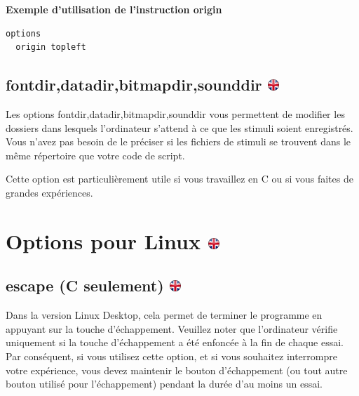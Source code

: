 \documentclass[
]{book}
\begin{document}
\textbf{Exemple d'utilisation de l'instruction origin}

\begin{verbatim}
options
  origin topleft
\end{verbatim}

\hypertarget{fontdirdatadirbitmapdirsounddir}{%
\subsection[fontdir,datadir,bitmapdir,sounddir ]{\texorpdfstring{fontdir,datadir,bitmapdir,sounddir \href{https://www.psytoolkit.org/doc3.2.0/syntax.html\#options-sounddir}{\protect\includegraphics{img/ukflag.png}}}{fontdir,datadir,bitmapdir,sounddir }}\label{fontdirdatadirbitmapdirsounddir}}

Les options fontdir,datadir,bitmapdir,sounddir vous permettent de modifier les dossiers dans lesquels l'ordinateur s'attend à ce que les stimuli soient enregistrés. Vous n'avez pas besoin de le préciser si les fichiers de stimuli se trouvent dans le même répertoire que votre code de script.

Cette option est particulièrement utile si vous travaillez en C ou si vous faites de grandes expériences.

\hypertarget{options-pour-linux}{%
\section[Options pour Linux ]{\texorpdfstring{Options pour Linux \href{https://www.psytoolkit.org/doc3.2.0/syntax.html\#options-sounddir}{\protect\includegraphics{img/ukflag.png}}}{Options pour Linux }}\label{options-pour-linux}}

\hypertarget{escape-c-seulement}{%
\subsection[escape (C seulement) ]{\texorpdfstring{escape (C seulement) \href{https://www.psytoolkit.org/doc3.2.0/syntax.html\#options-escape}{\protect\includegraphics{img/ukflag.png}}}{escape (C seulement) }}\label{escape-c-seulement}}

Dans la version Linux Desktop, cela permet de terminer le programme en appuyant sur la touche d'échappement. Veuillez noter que l'ordinateur vérifie uniquement si la touche d'échappement a été enfoncée à la fin de chaque essai. Par conséquent, si vous utilisez cette option, et si vous souhaitez interrompre votre expérience, vous devez maintenir le bouton d'échappement (ou tout autre bouton utilisé pour l'échappement) pendant la durée d'au moins un essai.
\end{document}
